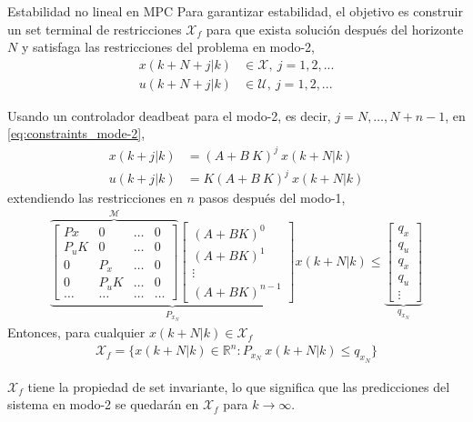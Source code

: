 \documentclass[8pt]{beamer}
\begin{document}
\begin{frame}[fragile]{Estabilidad no lineal en MPC}
	Para garantizar estabilidad, el objetivo es construir un set terminal de restricciones $\mathcal{X}_f$ para que exista solución después del horizonte $N$ y satisfaga las restricciones del problema en modo-2,
	\begin{equation}\label{eq:constraints_mode-2}
	\begin{aligned}
		x(k+N+j|k) & \in \mathcal{X},~j=1,2,... \\
		u(k+N+j|k) & \in \mathcal{U},~j=1,2,...
	\end{aligned}  
	\end{equation}
	
	Usando un controlador deadbeat para el modo-2, es decir, $j=N,\dots,N+n-1$, en \eqref{eq:constraints_mode-2},
	\begin{equation}
	\begin{aligned}
		x(k+j|k) & = (A+B~K)^j~x(k+N|k)  \\
		u(k+j|k) & = K(A+B~K)^j~x(k+N|k)
	\end{aligned}
	\end{equation}
	extendiendo las restricciones en $n$ pasos después del modo-1, 
	\begin{equation}
	\begin{aligned}
	\underbrace{
		\overbrace{
			\begin{bmatrix}
			Px    & 0     & \dots & 0     \\
			P_u K & 0     & \dots & 0     \\
			0     & P_x   & \dots & 0     \\
			0     & P_u K & \dots & 0     \\
			\dots & \dots & \dots & \dots
			\end{bmatrix}
		}^{\mathcal{M}}
		\begin{bmatrix}
		(A+B K)^0\\
		(A+B K)^1 \\
		\vdots\\
		(A+B K)^{n-1}
		\end{bmatrix}
	}_{P_{x_N}}
	x(k+N|k)
	\leq
	\underbrace{
		\begin{bmatrix}
		q_x\\
		q_u\\
		q_x\\
		q_u\\
		\vdots
		\end{bmatrix}
	}_{q_{x_N}}
	\end{aligned}
	\end{equation}
	Entonces, para cualquier $x(k+N|k) \in \mathcal{X}_f$ 
	\begin{align}\label{eq:Xf}
	\mathcal{X}_f = \{ x(k+N|k) \in \mathbb{R}^n : P_{x_N}~x(k+N|k) \leq q_{x_N} \}
	\end{align}
	
	$\mathcal{X}_f$ tiene la propiedad de set invariante, lo que significa que las predicciones del sistema en modo-2 se quedarán en $\mathcal{X}_f$ para $k\rightarrow\infty$.
\end{frame}
\end{document}

